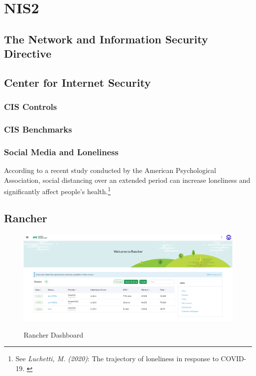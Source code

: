 %
%

\pagebreak
\section{NIS2}

\onehalfspacing

\subsection{The Network and Information Security Directive}

\subsection{Center for Internet Security}

\subsubsection{CIS Controls}

\subsubsection{CIS Benchmarks}

\subsubsection{Social Media and Loneliness}

According to a recent study conducted by the American Psychological Association, social distancing over an extended period can increase loneliness and significantly affect people's health.\footnote{See \textit{Luchetti, M. (2020)}: The trajectory of loneliness in response to COVID-19. \cite{apaLoneliness}}

\subsection{Rancher}

\begin{figure}[H]
\centering
\caption {Rancher Dashboard}
\includegraphics[width=\linewidth]{images/rancher-dashboard.png}
\label{fig:rancherDashboard}
\end{figure}

